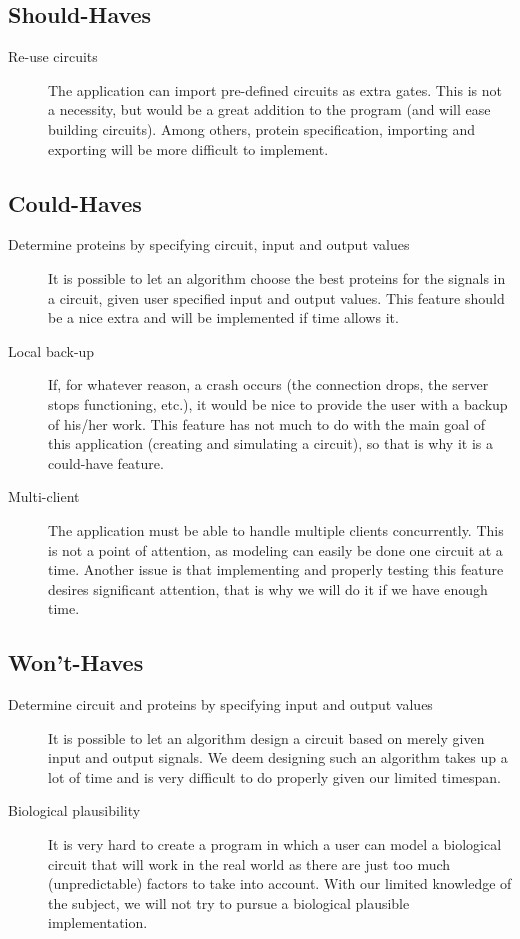 \documentclass[a4paper]{article}
\begin{document}
\subsection{Should-Haves}
\begin{description}
\item[Re-use circuits] The application can import pre-defined circuits as extra gates. This is not a necessity, but would be a great addition to the program (and will ease building circuits). Among others, protein specification, importing and exporting will be more difficult to implement.
\end{description}

\subsection{Could-Haves}
\begin{description}
\item[Determine proteins by specifying circuit, input and output values] It is possible to let an algorithm choose the best proteins for the signals in a circuit, given user specified input and output values. This feature should be a nice extra and will be implemented if time allows it.
\item[Local back-up] If, for whatever reason, a crash occurs (the connection drops, the server stops functioning, etc.), it would be nice to provide the user with a backup of his/her work. This feature has not much to do with the main goal of this application (creating and simulating a circuit), so that is why it is a could-have feature.
\item[Multi-client] The application must be able to handle multiple clients concurrently. This is not a point of attention, as modeling can easily be done one circuit at a time. Another issue is that implementing and properly testing this feature desires significant attention, that is why we will do it if we have enough time.
\end{description}

\subsection{Won't-Haves}
\begin{description}
\item[Determine circuit and proteins by specifying input and output values] It is possible to let an algorithm design a circuit based on merely given input and output signals. We deem designing such an algorithm takes up a lot of time and is very difficult to do properly given our limited timespan.
\item[Biological plausibility] It is very hard to create a program in which a user can model a biological circuit that will work in the real world as there are just too much (unpredictable) factors to take into account. With our limited knowledge of the subject, we will not try to pursue a biological plausible implementation.
\end{description}
\end{document}
